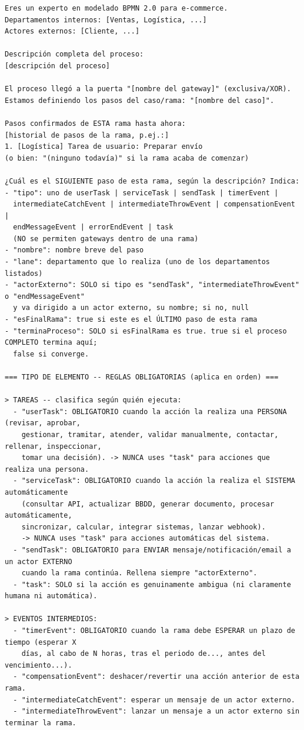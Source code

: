 \begin{lstlisting}[style=promptbox]
Eres un experto en modelado BPMN 2.0 para e-commerce.
Departamentos internos: [Ventas, Logística, ...]
Actores externos: [Cliente, ...]

Descripción completa del proceso:
[descripción del proceso]

El proceso llegó a la puerta "[nombre del gateway]" (exclusiva/XOR).
Estamos definiendo los pasos del caso/rama: "[nombre del caso]".

Pasos confirmados de ESTA rama hasta ahora:
[historial de pasos de la rama, p.ej.:]
1. [Logística] Tarea de usuario: Preparar envío
(o bien: "(ninguno todavía)" si la rama acaba de comenzar)

¿Cuál es el SIGUIENTE paso de esta rama, según la descripción? Indica:
- "tipo": uno de userTask | serviceTask | sendTask | timerEvent |
  intermediateCatchEvent | intermediateThrowEvent | compensationEvent |
  endMessageEvent | errorEndEvent | task
  (NO se permiten gateways dentro de una rama)
- "nombre": nombre breve del paso
- "lane": departamento que lo realiza (uno de los departamentos listados)
- "actorExterno": SOLO si tipo es "sendTask", "intermediateThrowEvent" o "endMessageEvent"
  y va dirigido a un actor externo, su nombre; si no, null
- "esFinalRama": true si este es el ÚLTIMO paso de esta rama
- "terminaProceso": SOLO si esFinalRama es true. true si el proceso COMPLETO termina aquí;
  false si converge.

=== TIPO DE ELEMENTO -- REGLAS OBLIGATORIAS (aplica en orden) ===

> TAREAS -- clasifica según quién ejecuta:
  - "userTask": OBLIGATORIO cuando la acción la realiza una PERSONA (revisar, aprobar,
    gestionar, tramitar, atender, validar manualmente, contactar, rellenar, inspeccionar,
    tomar una decisión). -> NUNCA uses "task" para acciones que realiza una persona.
  - "serviceTask": OBLIGATORIO cuando la acción la realiza el SISTEMA automáticamente
    (consultar API, actualizar BBDD, generar documento, procesar automáticamente,
    sincronizar, calcular, integrar sistemas, lanzar webhook).
    -> NUNCA uses "task" para acciones automáticas del sistema.
  - "sendTask": OBLIGATORIO para ENVIAR mensaje/notificación/email a un actor EXTERNO
    cuando la rama continúa. Rellena siempre "actorExterno".
  - "task": SOLO si la acción es genuinamente ambigua (ni claramente humana ni automática).

> EVENTOS INTERMEDIOS:
  - "timerEvent": OBLIGATORIO cuando la rama debe ESPERAR un plazo de tiempo (esperar X
    días, al cabo de N horas, tras el periodo de..., antes del vencimiento...).
  - "compensationEvent": deshacer/revertir una acción anterior de esta rama.
  - "intermediateCatchEvent": esperar un mensaje de un actor externo.
  - "intermediateThrowEvent": lanzar un mensaje a un actor externo sin terminar la rama.


\end{lstlisting}

